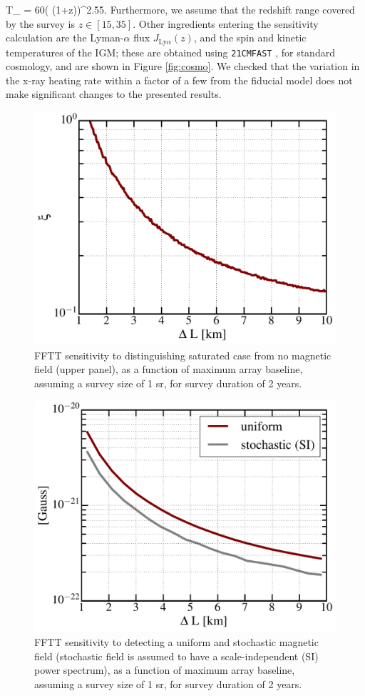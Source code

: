 \beq
T_  = 60\left( (1+z)\right)^{2.55}\text{   [K]}.
\label{eq:tsys}
\eeq
Furthermore, we assume that the redshift range covered by the survey is $z\in[15,35]$.  Other ingredients entering the sensitivity calculation are the Lyman-$\alpha$ flux $J_{\text{Ly}\alpha}(z)$, and the spin and kinetic temperatures of the IGM; these are obtained using \texttt{21CMFAST} \cite{2011MNRAS.411..955M}, for standard cosmology, and are shown in Figure \ref{fig:cosmo}. We checked that the variation in the x-ray heating rate within a factor of a few from the fiducial model does not make significant changes to the presented results.

\begin{figure}
\centering
\includegraphics[width=.35\textwidth,keepaspectratio=true]{xi_vs_deltas.pdf}
\caption{FFTT sensitivity to distinguishing saturated case from no magnetic field (upper panel), as a function of maximum array baseline, assuming a survey size of 1 sr, for survey duration of 2 years.\label{fig:xi_vs_deltas}}
\end{figure}
\begin{figure}
\centering
\includegraphics[width=.35\textwidth,keepaspectratio=true]{sigma_vs_deltas.pdf}
\caption{FFTT sensitivity to detecting a uniform and stochastic magnetic field (stochastic field is assumed to have a scale-independent (SI) power spectrum), as a function of maximum array baseline, assuming a survey size of 1 sr, for survey duration of 2 years.\label{fig:sigma_vs_deltas}}
\end{figure}

